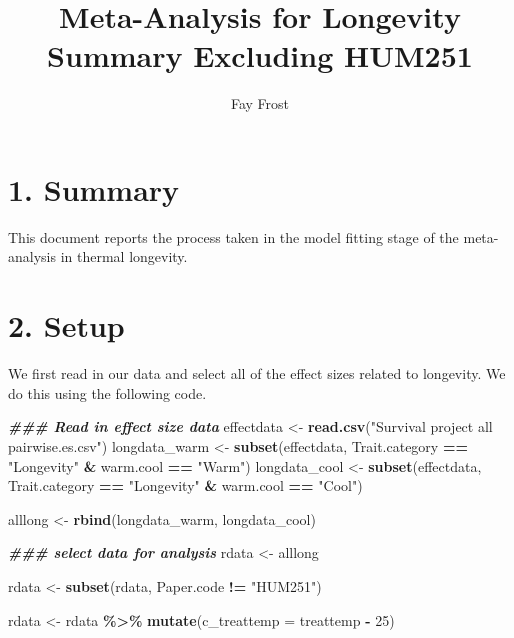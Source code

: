 \documentclass[
]{article}
\title{Meta-Analysis for Longevity Summary Excluding HUM251}
\author{Fay Frost}
\date{}
\newenvironment{Shaded}{\begin{snugshade}}{\end{snugshade}}
\newcommand{\AttributeTok}[1]{\textcolor[rgb]{0.13,0.29,0.53}{#1}}
\newcommand{\DecValTok}[1]{\textcolor[rgb]{0.00,0.00,0.81}{#1}}
\newcommand{\DocumentationTok}[1]{\textcolor[rgb]{0.56,0.35,0.01}{\textbf{\textit{#1}}}}
\newcommand{\FunctionTok}[1]{\textcolor[rgb]{0.13,0.29,0.53}{\textbf{#1}}}
\newcommand{\NormalTok}[1]{#1}
\newcommand{\OtherTok}[1]{\textcolor[rgb]{0.56,0.35,0.01}{#1}}
\newcommand{\SpecialCharTok}[1]{\textcolor[rgb]{0.81,0.36,0.00}{\textbf{#1}}}
\newcommand{\StringTok}[1]{\textcolor[rgb]{0.31,0.60,0.02}{#1}}
\begin{document}
\maketitle

\hypertarget{summary}{%
\section{1. Summary}\label{summary}}

This document reports the process taken in the model fitting stage of
the meta-analysis in thermal longevity.

\hypertarget{setup}{%
\section{2. Setup}\label{setup}}

We first read in our data and select all of the effect sizes related to
longevity. We do this using the following code.

\begin{Shaded}
\begin{Highlighting}[]
\DocumentationTok{\#\#\# Read in effect size data}
\NormalTok{effectdata }\OtherTok{\textless{}{-}} \FunctionTok{read.csv}\NormalTok{(}\StringTok{"Survival project all pairwise.es.csv"}\NormalTok{)}
\NormalTok{longdata\_warm }\OtherTok{\textless{}{-}} \FunctionTok{subset}\NormalTok{(effectdata, Trait.category }\SpecialCharTok{==} \StringTok{"Longevity"} \SpecialCharTok{\&}
\NormalTok{    warm.cool }\SpecialCharTok{==} \StringTok{"Warm"}\NormalTok{)}
\NormalTok{longdata\_cool }\OtherTok{\textless{}{-}} \FunctionTok{subset}\NormalTok{(effectdata, Trait.category }\SpecialCharTok{==} \StringTok{"Longevity"} \SpecialCharTok{\&}
\NormalTok{    warm.cool }\SpecialCharTok{==} \StringTok{"Cool"}\NormalTok{)}

\NormalTok{alllong }\OtherTok{\textless{}{-}} \FunctionTok{rbind}\NormalTok{(longdata\_warm, longdata\_cool)}

\DocumentationTok{\#\#\# select data for analysis}
\NormalTok{rdata }\OtherTok{\textless{}{-}}\NormalTok{ alllong}

\NormalTok{rdata }\OtherTok{\textless{}{-}} \FunctionTok{subset}\NormalTok{(rdata, Paper.code }\SpecialCharTok{!=} \StringTok{"HUM251"}\NormalTok{)}

\NormalTok{rdata }\OtherTok{\textless{}{-}}\NormalTok{ rdata }\SpecialCharTok{\%\textgreater{}\%}
    \FunctionTok{mutate}\NormalTok{(}\AttributeTok{c\_treattemp =}\NormalTok{ treattemp }\SpecialCharTok{{-}} \DecValTok{25}\NormalTok{)}
\end{Highlighting}
\end{Shaded}
\end{document}
